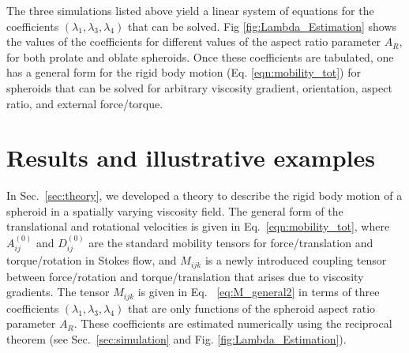 \documentclass{jfm}
\begin{document}


The three simulations listed above yield a linear system of equations for the coefficients $(\lambda_1,\lambda_3,\lambda_4)$ that can be solved.  Fig \ref{fig:Lambda_Estimation} shows the values of the coefficients for different values of the aspect ratio parameter $A_R$, for both prolate and oblate spheroids.  Once these coefficients are tabulated, one has a general form for the rigid body motion (Eq. \eqref{eqn:mobility_tot}) for spheroids that can be solved for arbitrary viscosity gradient, orientation, aspect ratio, and external force/torque.
















\section{Results and illustrative examples} \label{sec:results}

In Sec.~\ref{sec:theory}, we developed a theory to describe the rigid body motion of a spheroid in a spatially varying viscosity field. The general form of the translational and rotational velocities is given in Eq.~\eqref{eqn:mobility_tot}, where $A_{ij}^{(0)}$ and $D_{ij}^{(0)}$ are the standard mobility tensors for force/translation and torque/rotation in Stokes flow, and $M_{ijk}$ is a newly introduced coupling tensor between force/rotation and torque/translation that arises due to viscosity gradients.  The tensor $M_{ijk}$ is given in Eq. ~\eqref{eq:M_general2} in terms of three coefficients $(\lambda_1, \lambda_3, \lambda_4)$ that are only functions of the spheroid aspect ratio parameter $A_R$.  These coefficients are estimated numerically using the reciprocal theorem (see Sec.~\ref{sec:simulation} and Fig. \ref{fig:Lambda_Estimation}). 
\end{document}
